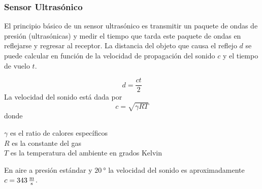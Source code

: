\begin{frame}
    \frametitle{Sensor Ultrasónico}
    
    El principio básico de un sensor ultrasónico es transmitir un paquete de ondas de presión (ultrasónicas) y medir el tiempo que tarda este paquete de ondas en reflejarse y regresar al receptor. La distancia del objeto que causa el reflejo  $d$ se puede calcular en función de la velocidad de propagación del sonido $c$ y el tiempo de vuelo $t$.
    
    \begin{equation*}
        d = \dfrac{c t}{2}
    \end{equation*}
    La velocidad del sonido está dada por
    \begin{equation*}
        c = \sqrt{\gamma R T}
    \end{equation*}
    donde
    
    $\gamma$ es el ratio de calores específicos\\
    $R$ es la constante del gas\\
    $T$ es la temperatura del ambiente en grados Kelvin
    
    En aire a presión estándar y $\SI{20}{\degree}$ la velocidad del sonido es aproximadamente $c = \SI{343}{\meter\over\second}$.
\end{frame}
